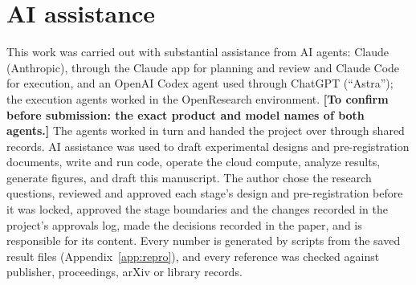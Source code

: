 \documentclass[11pt,letterpaper]{article}
\begin{document}
\section{AI assistance}
\label{app:ai}
This work was carried out with substantial assistance from AI agents: Claude (Anthropic), through the Claude app for
planning and review and Claude Code for execution, and an OpenAI Codex agent used through ChatGPT (``Astra''); the
execution agents worked in the OpenResearch environment. \textbf{[To confirm before
submission: the exact product and model names of both agents.]} The agents worked in turn and handed the project over
through shared records. AI assistance was used to draft experimental designs
and pre-registration documents, write and run code, operate the cloud compute, analyze results, generate figures, and
draft this manuscript. The author chose the research questions, reviewed and approved each stage's design and
pre-registration before it was locked, approved the stage boundaries and the changes recorded in the project's
approvals log, made the decisions recorded in the paper, and is responsible for its content. Every number is generated by scripts from the saved result files
(Appendix~\ref{app:repro}), and every reference was checked against publisher, proceedings, arXiv or library records.
\end{document}
